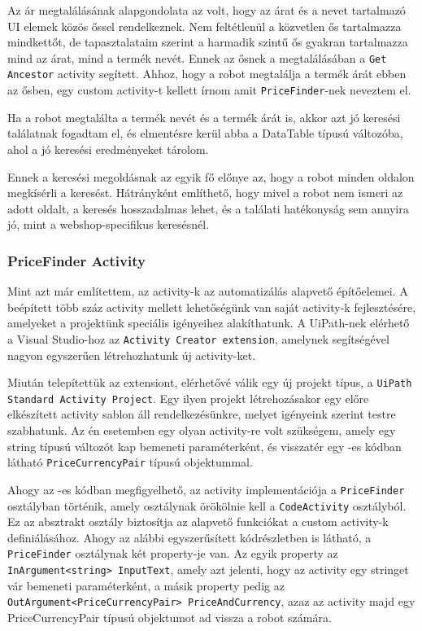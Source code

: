 \documentclass[
]{thesis-ekf}
\theoremstyle{definition}
\theoremstyle{remark}
\begin{document}
Az ár megtalálásának alapgondolata az volt, hogy az árat és a nevet tartalmazó UI elemek közös őssel rendelkeznek. Nem feltétlenül a közvetlen ős tartalmazza mindkettőt, de tapasztalataim szerint a harmadik szintű ős gyakran tartalmazza mind az árat, mind a termék nevét. Ennek az ősnek a megtalálásában a \texttt{Get Ancestor} activity segített. Ahhoz, hogy a robot megtalálja a termék árát ebben az ősben, egy custom activity-t kellett írnom amit \texttt{PriceFinder}-nek neveztem el. 

Ha a robot megtalálta a termék nevét és a termék árát is, akkor azt jó keresési találatnak fogadtam el, és elmentésre kerül abba a DataTable típusú változóba, ahol a jó keresési eredményeket tárolom.

Ennek a keresési megoldásnak az egyik fő előnye az, hogy a robot minden oldalon megkísérli a keresést. Hátrányként említhető, hogy mivel a robot nem ismeri az adott oldalt, a keresés hosszadalmas lehet, és a találati hatékonyság sem annyira jó, mint a webshop-specifikus keresésnél.


\subsubsection*{PriceFinder Activity \cite{ActivityCreator}}
Mint azt már említettem, az activity-k az automatizálás alapvető építőelemei. A beépített több száz activity mellett lehetőségünk van saját activity-k fejlesztésére, amelyeket a projektünk speciális igényeihez alakíthatunk. A UiPath-nek elérhető a Visual Studio-hoz az \texttt{Activity Creator extension}, amelynek segítségével nagyon egyszerűen létrehozhatunk új activity-ket.

Miután telepítettük az extensiont, elérhetővé válik egy új projekt típus, a \texttt{UiPath Standard Activity Project}. Egy ilyen projekt létrehozásakor egy előre elkészített activity sablon áll rendelkezésünkre, melyet igényeink szerint testre szabhatunk. Az én esetemben egy olyan activity-re volt szükségem, amely egy string típusú változót kap bemeneti paraméterként, és visszatér egy -es kódban látható \texttt{PriceCurrencyPair} típusú objektummal.



Ahogy az -es kódban megfigyelhető, az activity implementációja  a \texttt{PriceFinder} osztályban történik, amely osztálynak örökölnie kell a \texttt{CodeActivity} osztályból. Ez az absztrakt osztály biztosítja az alapvető funkciókat a custom activity-k definiálásához. Ahogy az alábbi egyszerűsített kódrészletben is látható, a \texttt{PriceFinder} osztálynak két property-je van. Az egyik property az \texttt{InArgument<string> InputText}, amely azt jelenti, hogy az activity egy stringet vár bemeneti paraméterként, a másik property pedig az \texttt{OutArgument<PriceCurrencyPair> PriceAndCurrency}, azaz az activity majd egy PriceCurrencyPair típusú objektumot ad vissza a robot számára.
\end{document}
